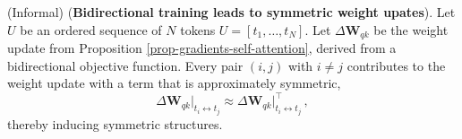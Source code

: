 \begin{theorem}
\label{theo-informal-symmetry}
%
(Informal)
%
(\textbf{Bidirectional training leads to symmetric weight upates}).
%
Let $U$ be an ordered sequence of $N$ tokens $U = [t_1, \dots, t_N]$.
%
Let $\Delta \bm{W}_{qk}$ be the weight update from Proposition \ref{prop-gradients-self-attention}, derived from a bidirectional objective function.
%
Every pair $(i,j)$ with $i \neq j$ contributes to the weight update with a term that is approximately symmetric,
%
\begin{equation}
    \Delta \bm{W}_{qk}\big|_{t_i \leftrightarrow t_j} \approx \Delta \bm{W}_{qk}\big|^\top_{t_i \leftrightarrow t_j} \,,
\end{equation}
%
thereby inducing symmetric structures.
%
\end{theorem}